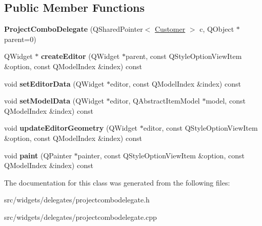 \subsection*{Public Member Functions}
\begin{DoxyCompactItemize}
\item 
\hypertarget{classProjectComboDelegate_a7688a501242e27b87f726362ccdcfbdf}{{\bfseries Project\+Combo\+Delegate} (Q\+Shared\+Pointer$<$ \hyperlink{classCustomer}{Customer} $>$ c, Q\+Object $\ast$parent=0)}\label{classProjectComboDelegate_a7688a501242e27b87f726362ccdcfbdf}

\item 
\hypertarget{classProjectComboDelegate_ae40f23839295fdc241db809306efe685}{Q\+Widget $\ast$ {\bfseries create\+Editor} (Q\+Widget $\ast$parent, const Q\+Style\+Option\+View\+Item \&option, const Q\+Model\+Index \&index) const }\label{classProjectComboDelegate_ae40f23839295fdc241db809306efe685}

\item 
\hypertarget{classProjectComboDelegate_a7137e9273866b4ec84c27008c8e56b79}{void {\bfseries set\+Editor\+Data} (Q\+Widget $\ast$editor, const Q\+Model\+Index \&index) const }\label{classProjectComboDelegate_a7137e9273866b4ec84c27008c8e56b79}

\item 
\hypertarget{classProjectComboDelegate_a38be02a558b238139249f268f10975a4}{void {\bfseries set\+Model\+Data} (Q\+Widget $\ast$editor, Q\+Abstract\+Item\+Model $\ast$model, const Q\+Model\+Index \&index) const }\label{classProjectComboDelegate_a38be02a558b238139249f268f10975a4}

\item 
\hypertarget{classProjectComboDelegate_a4d13025edcbe31b941566230656aa2bb}{void {\bfseries update\+Editor\+Geometry} (Q\+Widget $\ast$editor, const Q\+Style\+Option\+View\+Item \&option, const Q\+Model\+Index \&index) const }\label{classProjectComboDelegate_a4d13025edcbe31b941566230656aa2bb}

\item 
\hypertarget{classProjectComboDelegate_ab86015da02697c63c32a42bc69e13389}{void {\bfseries paint} (Q\+Painter $\ast$painter, const Q\+Style\+Option\+View\+Item \&option, const Q\+Model\+Index \&index) const }\label{classProjectComboDelegate_ab86015da02697c63c32a42bc69e13389}

\end{DoxyCompactItemize}


The documentation for this class was generated from the following files\+:\begin{DoxyCompactItemize}
\item 
src/widgets/delegates/projectcombodelegate.\+h\item 
src/widgets/delegates/projectcombodelegate.\+cpp\end{DoxyCompactItemize}
